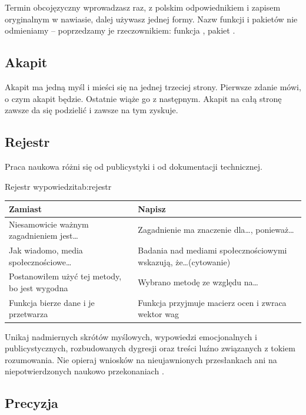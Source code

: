 Termin obcojęzyczny wprowadzasz raz, z polskim odpowiednikiem i zapisem oryginalnym w nawiasie, dalej używasz jednej formy. Nazw funkcji i pakietów nie odmieniamy -- poprzedzamy je rzeczownikiem: funkcja , pakiet .

\subsection{Akapit}

Akapit ma jedną myśl i mieści się na jednej trzeciej strony. Pierwsze zdanie mówi, o czym akapit będzie. Ostatnie wiąże go z następnym. Akapit na całą stronę zawsze da się podzielić i zawsze na tym zyskuje.

\subsection{Rejestr}

Praca naukowa różni się od publicystyki i od dokumentacji technicznej.

\begin{tabelaepi}{Rejestr wypowiedzi}{tab:rejestr}
\begin{tabular}{@{}p{6.4cm}p{6.8cm}@{}}
\toprule
Zamiast & Napisz \\
\midrule
Niesamowicie ważnym zagadnieniem jest\ldots & Zagadnienie ma znaczenie dla\ldots, ponieważ\ldots \\
Jak wiadomo, media społecznościowe\ldots & Badania nad mediami społecznościowymi wskazują, że\ldots (cytowanie) \\
Postanowiłem użyć tej metody, bo jest wygodna & Wybrano metodę ze względu na\ldots \\
Funkcja bierze dane i je przetwarza & Funkcja przyjmuje macierz ocen i zwraca wektor wag \\
\bottomrule
\end{tabular}
\end{tabelaepi}

Unikaj nadmiernych skrótów myślowych, wypowiedzi emocjonalnych i publicystycznych, rozbudowanych dygresji oraz treści luźno związanych z tokiem rozumowania. Nie opieraj wniosków na nieujawnionych przesłankach ani na niepotwierdzonych naukowo przekonaniach \parencite{instrukcjaISI}.

\subsection{Precyzja}

